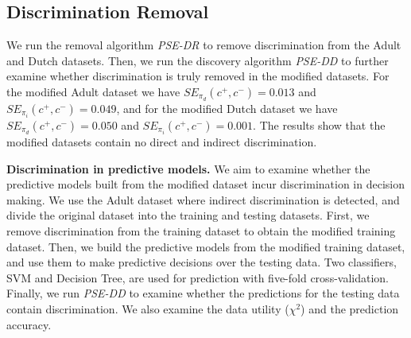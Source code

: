 \documentclass[letterpaper]{article}
\begin{document}
\subsection{Discrimination Removal}
We run the removal algorithm \emph{PSE-DR} to remove discrimination from the Adult and Dutch datasets. Then, we run the discovery algorithm \emph{PSE-DD} to further examine whether discrimination is truly removed in the modified datasets. For the modified Adult dataset we have $SE_{\pi_{d}}(c^{+},c^{-}) = 0.013$ and $SE_{\pi_{i}}(c^{+},c^{-}) = 0.049$, and for the modified Dutch dataset we have $SE_{\pi_{d}}(c^{+},c^{-}) = 0.050$ and $SE_{\pi_{i}}(c^{+},c^{-}) = 0.001$. The results show that the modified datasets contain no direct and indirect discrimination.


\textbf{Discrimination in predictive models.} We aim to examine whether the predictive models built from the modified dataset incur discrimination in decision making. We use the Adult dataset where indirect discrimination is detected, and divide the original dataset into the training and testing datasets. First, we remove discrimination from the training dataset to obtain the modified training dataset. Then, we build the predictive models from the modified training dataset, and use them to make predictive decisions over the testing data. Two classifiers, SVM and Decision Tree, are used for prediction with five-fold cross-validation. Finally, we run \emph{PSE-DD} to examine whether the predictions for the testing data contain discrimination. We also examine the data utility ($\chi^{2}$) and the prediction accuracy.
\end{document}
